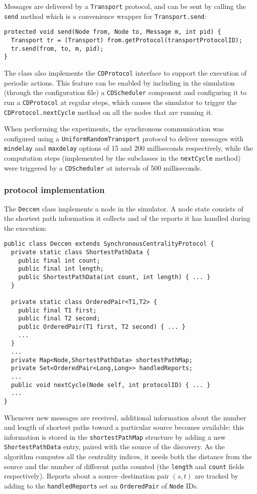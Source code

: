 Messages are delivered by a \texttt{Transport} protocol, and can be sent by calling the \texttt{send} method which is a convenience wrapper for \texttt{Transport.send}:
\begin{verbatim}
protected void send(Node from, Node to, Message m, int pid) {
  Transport tr = (Transport) from.getProtocol(transportProtocolID);
  tr.send(from, to, m, pid);
}
\end{verbatim}

The class also implements the \texttt{CDProtocol} interface to support the execution of periodic actions. This feature can be enabled by including in the simulation (through the configuration file) a \texttt{CDScheduler} component and configuring it to run a \texttt{CDProtocol} at regular steps, which causes the simulator to trigger the \texttt{CDProtocol.nextCycle} method on all the nodes that are running it.

When performing the experiments, the synchronous communication was configured using a \texttt{UniformRandomTransport} protocol to deliver messages with \texttt{mindelay} and \texttt{maxdelay} options of 15 and 200 milliseconds respectively, while the computation steps (implemented by the subclasses in the \texttt{nextCycle} method) were triggered by a \texttt{CDScheduler} at intervals of 500 milliseconds.  

\subsubsection{\deccen{} protocol implementation}

The \texttt{Deccen} class implements a \deccen{} node in the simulator. A node state consists of the shortest path information it collects and of the reports it has handled during the execution:
\begin{verbatim}
public class Deccen extends SynchronousCentralityProtocol {
  private static class ShortestPathData {
    public final int count;
    public final int length;
    public ShortestPathData(int count, int length) { ... }
  }

  private static class OrderedPair<T1,T2> {
    public final T1 first;
    public final T2 second;
    public OrderedPair(T1 first, T2 second) { ... }
    ...
  }
  ...
  private Map<Node,ShortestPathData> shortestPathMap;
  private Set<OrderedPair<Long,Long>> handledReports;
  ...
  public void nextCycle(Node self, int protocolID) { ... }
  ...
}
\end{verbatim}
Whenever new \mdisc{} messages are received, additional information about the number and length of shortest paths toward a particular source becomes available: this information is stored in the \texttt{shortestPathMap} structure by adding a new \texttt{ShortestPathData} entry, paired with the source of the discovery. As the algorithm computes all the centrality indices, it needs both the distance from the source and the number of different paths counted (the \texttt{length} and \texttt{count} fields respectively). Reports about a source--destination pair $(s,t)$ are tracked by adding to the \texttt{handledReports} set an \texttt{Ordered\-Pair} of \texttt{Node} IDs.

